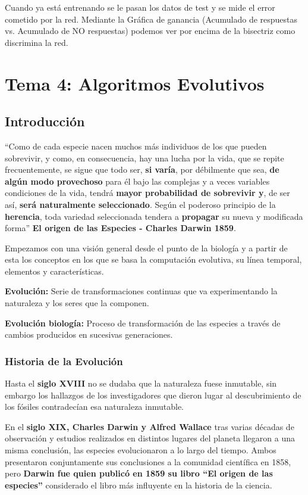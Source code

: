 \documentclass[12pt, twoside, openright]{report} %
\begin{document}
Cuando ya está entrenando se le pasan los datos de test y se mide el error cometido por la red. Mediante la Gráfica de ganancia (Acumulado de respuestas vs. Acumulado de NO respuestas) podemos ver por encima de la bisectriz como discrimina la red.

\chapter{Tema 4: Algoritmos Evolutivos}
\section{Introducción}
“Como de cada especie nacen muchos más individuos de los que pueden sobrevivir, y como, en consecuencia, hay una lucha por la vida, que se repite frecuentemente, se sigue que todo ser, \textbf{si varía}, por débilmente que sea, \textbf{de algún modo provechoso} para él bajo las complejas y a veces variables condiciones de la vida, tendrá \textbf{mayor probabilidad de sobrevivir y}, de ser así, \textbf{será naturalmente seleccionado}. Según el poderoso principio de la \textbf{herencia}, toda variedad seleccionada tendera a \textbf{propagar} su nueva y modificada forma” \textbf{El origen de las Especies - Charles Darwin 1859}.

Empezamos con una visión general desde el punto de la biología y a partir de esta los conceptos en los que se basa la computación evolutiva, su línea temporal, elementos y características.

\textbf{Evolución:} Serie de transformaciones continuas que va experimentando la naturaleza y los seres que la componen.

\textbf{Evolución biología:} Proceso de transformación de las especies a través de cambios producidos en sucesivas generaciones.

\subsection{Historia de la Evolución}
Hasta el \textbf{siglo XVIII} no se dudaba que la naturaleza fuese inmutable, sin embargo los hallazgos de los investigadores que dieron lugar al descubrimiento de los fósiles contradecían esa naturaleza inmutable.

En el \textbf{siglo XIX, Charles Darwin y Alfred Wallace} tras varias décadas de observación y estudios realizados en distintos lugares del planeta llegaron a una misma conclusión, las especies evolucionaron a lo largo del tiempo. Ambos presentaron conjuntamente sus conclusiones a la comunidad científica en 1858, pero \textbf{Darwin fue quien publicó en 1859 su libro “El origen de las especies”} considerado el libro más influyente en la historia de la ciencia.
\end{document}
